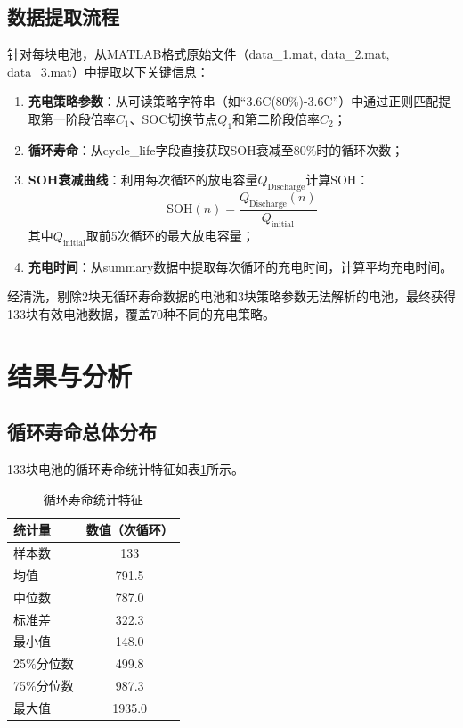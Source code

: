 \documentclass[withoutpreface]{cumcmthesis}
\begin{document}
\subsection{数据提取流程}
针对每块电池，从MATLAB格式原始文件（data\_1.mat, data\_2.mat, data\_3.mat）中提取以下关键信息：

\begin{enumerate}
    \item \textbf{充电策略参数}：从可读策略字符串（如``3.6C(80\%)-3.6C''）中通过正则匹配提取第一阶段倍率$C_1$、SOC切换节点$Q_1$和第二阶段倍率$C_2$；
    \item \textbf{循环寿命}：从cycle\_life字段直接获取SOH衰减至80\%时的循环次数；
    \item \textbf{SOH衰减曲线}：利用每次循环的放电容量$Q_{\text{Discharge}}$计算SOH：
    \begin{equation}
        \text{SOH}(n) = \frac{Q_{\text{Discharge}}(n)}{Q_{\text{initial}}}
    \end{equation}
    其中$Q_{\text{initial}}$取前5次循环的最大放电容量；
    \item \textbf{充电时间}：从summary数据中提取每次循环的充电时间，计算平均充电时间。
\end{enumerate}

经清洗，剔除2块无循环寿命数据的电池和3块策略参数无法解析的电池，最终获得133块有效电池数据，覆盖70种不同的充电策略。

\section{结果与分析}

\subsection{循环寿命总体分布}

133块电池的循环寿命统计特征如表\ref{tab:life_stats}所示。

\begin{table}[H]
\centering
\caption{循环寿命统计特征}
\label{tab:life_stats}
\begin{tabular}{lc}
\toprule
统计量 & 数值（次循环） \\
\midrule
样本数 & 133 \\
均值 & 791.5 \\
中位数 & 787.0 \\
标准差 & 322.3 \\
最小值 & 148.0 \\
25\%分位数 & 499.8 \\
75\%分位数 & 987.3 \\
最大值 & 1935.0 \\
\bottomrule
\end{tabular}
\end{table}
\end{document}
